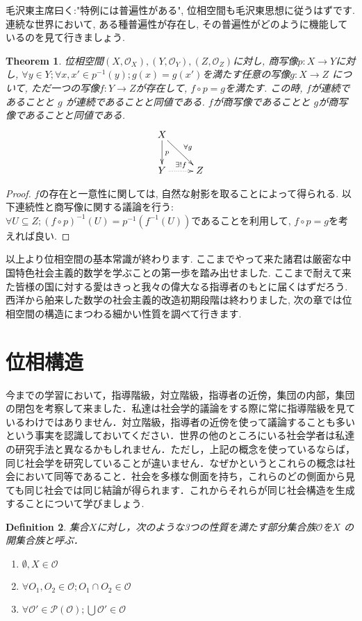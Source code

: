 \documentclass[lualatex]{ltjsbook}
\newtheorem{theorem}{Theorem}[section]
\newtheorem{definition}[theorem]{Definition}
\theoremstyle{remark}
\theoremstyle{plain}
\begin{document}
毛沢東主席曰く:"特例には普遍性がある", 位相空間も毛沢東思想に従うはずです. 連続な世界において, ある種普遍性が存在し, その普遍性がどのように機能しているのを見て行きましょう.

\begin{theorem}%
	位相空間$\left( X, \mathcal{O}_X \right) ,\left( Y,\mathcal{O}_Y \right) , \left( Z , \mathcal{O}_Z\right) $に対し, 商写像$p: X \to Y$に対し, $\forall y \in Y; \forall x ,x'\in p ^{-1}({y});g(x)=g(x')$を満たす任意の写像$g: X \to Z$ について, ただ一つの写像$f: Y\to Z$が存在して, $f \circ p = g$を満たす. この時,  $f$が連続であることと $g$ が連続であることと同値である. $f$が商写像であることと $g$が商写像であることと同値である.
\[
	\xymatrix{
		X \ar[d]^{p} \ar[rd]^{\forall g} \\
		Y \ar@{..>}[r]^{\exists !f} &Z
	}
\] 		
\end{theorem}

\begin{proof}%
	$f$の存在と一意性に関しては, 自然な射影を取ることによって得られる. 以下連続性と商写像に関する議論を行う:
	 $\forall U \subseteq Z; \left( f\circ p \right) ^{-1}(U) = p^{-1}(f^{-1}(U))$であることを利用して, $f\circ p =g$を考えれば良い. 
\end{proof}

以上より位相空間の基本常識が終わります. ここまでやって来た諸君は厳密な中国特色社会主義的数学を学ぶことの第一歩を踏み出せました. ここまで耐えて来た皆様の国に対する愛はきっと我々の偉大なる指導者のもとに届くはずだろう. 西洋から舶来した数学の社会主義的改造初期段階は終わりました, 次の章では位相空間の構造にまつわる細かい性質を調べて行きます.

\section{位相構造}
今までの学習において，指導階級，対立階級，指導者の近傍，集団の内部，集団の閉包を考察して来ました．私達は社会学的議論をする際に常に指導階級を見ているわけではありません．対立階級，指導者の近傍を使って議論することも多いという事実を認識しておいてください．世界の他のところにいる社会学者は私達の研究手法と異なるかもしれません．ただし，上記の概念を使っているならば，同じ社会学を研究していることが違いません．なぜかというとこれらの概念は社会において同等であること．社会を多様な側面を持ち，これらのどの側面から見ても同じ社会では同じ結論が得られます．これからそれらが同じ社会構造を生成することについて学びましょう.

\begin{definition}
	集合$X$に対し，次のような3つの性質を満たす部分集合族$\mathcal{O}$を$X$ の開集合族と呼ぶ．
	\begin{enumerate}
		\item $\emptyset , X \in \mathcal{O}$ 
	\item $\forall O_1, O_2 \in  \mathcal{O} ;O_1 \cap O_2 \in \mathcal{O}$ 
		\item $\forall \mathcal{O}' \in \mathcal{P}(\mathcal{O}); \bigcup \mathcal{O}' \in \mathcal{O} $
	\end{enumerate}
\end{definition}
\end{document}
